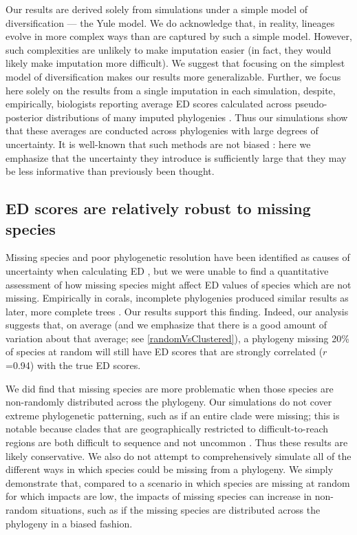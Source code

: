 \documentclass[12pt,english]{article}
\begin{document}
Our results are derived solely from simulations under a simple model of
diversification — the Yule model. We do acknowledge that, in reality, lineages
evolve in more complex ways than are captured by such a simple model. However,
such complexities are unlikely to make imputation easier (in fact, they would
likely make imputation more difficult). We suggest that focusing on the simplest
model of diversification makes our results more generalizable. Further, we focus
here solely on the results from a single imputation in each simulation, despite,
empirically, biologists reporting average ED scores calculated across
pseudo-posterior distributions of many imputed phylogenies \autocite{Kuhn2011}.
Thus our simulations show that these averages are conducted across phylogenies
with large degrees of uncertainty. It is well-known that such methods are not
biased \autocite[indeed, this was originally shown by][]{Kuhn2011}: here we
emphasize that the uncertainty they introduce is sufficiently large that they
may be less informative than previously been thought.

\subsection*{ED scores are relatively robust to missing species}
Missing species and poor phylogenetic resolution have been identified as causes
of uncertainty when calculating ED \autocite{Isaac2007}, but we were unable to
find a quantitative assessment of how missing species might affect ED values of
species which are not missing. Empirically in corals, incomplete phylogenies
produced similar results as later, more complete trees \autocite{Curnick2015}.
Our results support this finding. Indeed, our analysis suggests that, on average
(and we emphasize that there is a good amount of variation about that average;
see \ref{randomVsClustered}), a phylogeny missing 20\% of species at random will
still have ED scores that are strongly correlated ($r$=0.94) with the true ED
scores.

We did find that missing species are more problematic when those species are
non-randomly distributed across the phylogeny. Our simulations do not cover
extreme phylogenetic patterning, such as if an entire clade were missing; this
is notable because clades that are geographically restricted to
difficult-to-reach regions are both difficult to sequence and not uncommon
\autocite[][]{Arrigoni2012}. Thus these results are likely conservative. We also do
not attempt to comprehensively simulate all of the different ways in which
species could be missing from a phylogeny. We simply demonstrate that, compared
to a scenario in which species are missing at random for which impacts are low,
the impacts of missing species can increase in non-random situations, such as if
the missing species are distributed across the phylogeny in a biased fashion.
\end{document}
